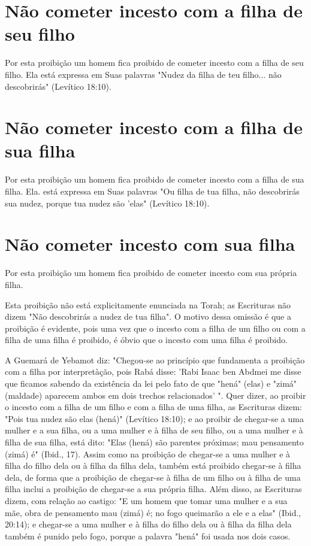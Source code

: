 \begin{itemize}
\begin{enumrate}
\begin{itemize}
\begin{itemize}
\begin{itemize}
\section{Não cometer incesto com a filha de seu filho}

Por esta proibição um homem fica proibido de cometer incesto com a filha
de seu filho. Ela está expressa em Suas palavras "Nudez da filha de teu
filho... não descobrirás" (Levítico 18:10).


\section{Não cometer incesto com a filha de sua filha}

Por esta proibição um homem fica proibido de cometer incesto com a filha
de sua filha. Ela. está expressa em Suas palavras "Ou filha de tua
filha, não descobrirás sua nudez, porque tua nudez são 'elas" (Levítico
18:10).

\section{Não cometer incesto com sua filha}

Por esta proibição um homem fica proibido de cometer incesto com sua
própria filha.

Esta proibição não está explicitamente enunciada na Torah; as
Escri­turas não dizem "Não descobrirás a nudez de tua filha". O motivo
dessa omis­são é que a proibição é evidente, pois uma vez que o incesto
com a filha de um filho ou com a filha de uma filha é proibido, é óbvio
que o incesto com uma filha é proibido.

A Guemará de Yebamot diz: "Chegou-se ao princípio que fundamenta a
proibição com a filha por interpretàção, pois Rabá disse: 'Rabi Isaac
ben Abd­mei me disse que ficamos sabendo da existência da lei pelo fato
de que "hená" (elas) e "zimá" (maldade) aparecem ambos em dois trechos
relacionados' ". Quer dizer, ao proibir o incesto com a filha de um
filho e com a filha de uma filha, as Escrituras dizem: "Pois tua nudez
são elas (hená)" (Levítico 18:10); e ao proi­bir de chegar-se a uma
mulher e a sua filha, ou a uma mulher e à filha de seu filho, ou a uma
mulher e à filha de sua filha, está dito: "Elas (hená) são parentes
próximas; mau pensamento (zimá) é" (Ibid., 17). Assim como na proibição
de chegar-se a uma mulher e à filha do filho dela ou à filha da filha
dela, também está proibido chegar-se à filha dela, de forma que a
proibição de chegar-se à filha de um filho ou à filha de uma filha
inclui a proibição de chegar-se a sua própria filha. Além disso, as
Escrituras dizem, com relação ao castigo: "E um homem que tomar uma
mulher e a sua mãe, obra de pensamento mau (zimá) é; no fogo queimarão a
ele e a elas" (Ibid., 20:14); e chegar-se a uma mulher e à filha do
filho dela ou à filha da filha dela também é punido pelo fogo, por­que a
palavra "hená" foi usada nos dois casos.


\end{itemize}
\end{itemize}
\end{itemize}
\end{enumrate}
\end{itemize}
